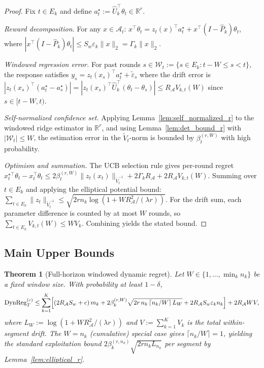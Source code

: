\documentclass[11pt]{article}
\newcommand{\R}{\mathbb{R}}
\newcommand{\cA}{\mathcal{A}}
\newcommand{\DynReg}{\mathrm{DynReg}}
\newtheorem{theorem}{Theorem}
\begin{document}
\begin{proof}
Fix $t \in E_k$ and define $a_t^\star := \widehat U_k^\top \theta_t \in \R^r$.

\emph{Reward decomposition.}
For any $x \in \cA_t$:
$x^\top \theta_t = z_t(x)^\top a_t^\star + x^\top(I - \widehat P_k)\theta_t$,
where $|x^\top(I - \widehat P_k)\theta_t| \le S_w\varepsilon_k\|x\|_2 = \Gamma_k\|x\|_2$.

\emph{Windowed regression error.}
For past rounds $s \in \mathcal W_t := \{s \in E_k : t - W \le s < t\}$,
the response satisfies $y_s = z_t(x_s)^\top a_t^\star + \tilde\varepsilon_s$ where
the drift error is
$|z_t(x_s)^\top (a_t^\star - a_s^\star)|
= |z_t(x_s)^\top \widehat U_k^\top (\theta_t - \theta_s)|
\le R_{\cA} V_{k,t}(W)$
since $s \in [t-W, t)$.

\emph{Self-normalized confidence set.}
Applying Lemma~\ref{lem:self_normalized_r} to the windowed ridge estimator
in $\R^r$, and using Lemma~\ref{lem:det_bound_r} with $|\mathcal{W}_t| \le W$,
the estimation error in the $\widetilde V_t$-norm is bounded by
$\beta_t^{(r,W)}$ with high probability.

\emph{Optimism and summation.}
The UCB selection rule gives per-round regret
$x_t^{\star\top}\theta_t - x_t^\top\theta_t
\le 2\beta_t^{(r,W)}\|z_t(x_t)\|_{\widetilde V_t^{-1}} + 2\Gamma_k R_{\cA} + 2R_{\cA} V_{k,t}(W)$.
Summing over $t \in E_k$ and applying the elliptical potential bound:
$\sum_{t \in E_k}\|z_t\|_{\widetilde V_t^{-1}} \le \sqrt{2rn_k\log(1 + WR_{\cA}^2/(\lambda r))}$.
For the drift sum, each parameter difference is counted by at most $W$ rounds, so
$\sum_{t \in E_k} V_{k,t}(W) \le W V_k$.
Combining yields the stated bound.
\end{proof}

\subsection{Main Upper Bounds}
\label{sec:main_upper}

\begin{theorem}[Full-horizon windowed dynamic regret]
\label{thm:full_horizon_windowed}
Let $W\in\{1,\ldots,\min_k n_k\}$ be a fixed window size.  With probability at
least $1-\delta$,
\begin{align*}
\DynReg_T^{(c)}\le
  \sum_{k=1}^K\Bigl[
    (2R_{\cA}S_w+c)\,m_k
    + 2\beta_k^{(r,W)}\sqrt{2r\,n_k\,\lceil n_k/W\rceil\,L_W}
    + 2R_{\cA}S_w\varepsilon_kn_k
  \Bigr]
  + 2R_{\cA}WV,
\end{align*}
where $L_W:=\log(1+WR_{\cA}^2/(\lambda r))$ and
$V:=\sum_{k=1}^K V_k$ is the total within-segment drift.  The $W=n_k$
(cumulative) special case gives $\lceil n_k/W\rceil=1$, yielding the standard
exploitation bound $2\beta_k^{(r,n_k)}\sqrt{2rn_k L_{n_k}}$ per segment by
Lemma~\ref{lem:elliptical_r}.
\end{theorem}
\end{document}
